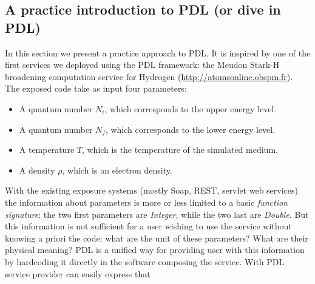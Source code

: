 \documentclass[a4paper,11pt] {ivoa}
\begin{document}
\subsection{A practice introduction to PDL (or dive in PDL)}\label{divePDL}
In this section we present a practice approach to PDL. It is inspired by one of the first services we deployed using the PDL framework: the Meudon Stark-H broadening computation service for Hydrogen (\href{http://atomsonline.obspm.fr}{http://atomsonline.obspm.fr}).\\
The exposed code take as input four parameters:
\begin{itemize}
\item A quantum number $N_i$, which corresponds to the upper energy level.
\item A quantum number $N_f$, which corresponds to the lower energy level.
\item A temperature $T$, which is the temperature of the simulated medium.
\item A density $\rho$, which is an electron density.
\end{itemize} 
With the existing exposure systems (mostly Soap, REST, servlet web services) the information about parameters is more or less limited to a basic {\it function signature}: the two first parameters are {\it Integer}, while the two last are {\it Double}. But this information is not sufficient for a user wishing to use the service without knowing {a priori} the code: what are the unit of these parameters? What are their physical meaning?
PDL is a unified way for providing user with this information by hardcoding it directly in the software composing the service. With PDL service provider can easily express that 
\end{document}
